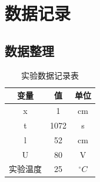 \documentclass[12pt,hyperref,a4paper,UTF8]{ctexart}
\begin{document}
\section{数据记录}
\subsection{数据整理}
\begin{table}[h]
	\centering
	\begin{tabular}{|c|c|c|}
		\hline
		变量 & 值 & 单位 \\
		\hline
		x & 1 & cm \\
		\hline
		t & 1072 & s \\
		\hline
		l & 52 & cm \\
		\hline
		U & 80 & V \\
		\hline
		实验温度 & 25 & $^{\circ}C$ \\
		\hline
	\end{tabular}
	\caption{实验数据记录表}
\end{table}
\end{document}
